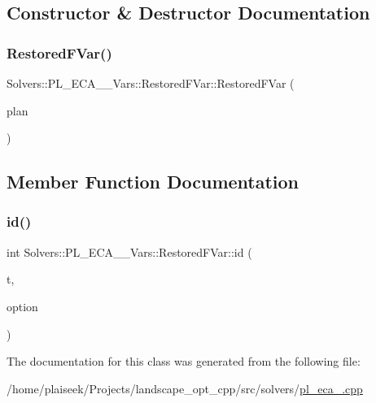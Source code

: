 \subsection{Constructor \& Destructor Documentation}
\mbox{\label{class_solvers_1_1_p_l___e_c_a__2___vars_1_1_restored_f_var_a1b2057a7d94477eb0f782cab5071de7c}} 
\subsubsection{\texorpdfstring{Restored\+F\+Var()}{RestoredFVar()}}
{\footnotesize\ttfamily Solvers\+::\+P\+L\+\_\+\+E\+C\+A\+\_\+\_\+\+Vars\+::\+Restored\+F\+Var\+::\+Restored\+F\+Var (\begin{DoxyParamCaption}\item[{const \hyperlink{class_restoration_plan}{Restoration\+Plan} \&}]{plan }\end{DoxyParamCaption})\hspace{0.3cm}{\ttfamily [inline]}}



\subsection{Member Function Documentation}
\mbox{\label{class_solvers_1_1_p_l___e_c_a__2___vars_1_1_restored_f_var_a90719c3bd2b7d3bdbafd8c3f01a4b598}} 
\subsubsection{\texorpdfstring{id()}{id()}}
{\footnotesize\ttfamily int Solvers\+::\+P\+L\+\_\+\+E\+C\+A\+\_\+\_\+\+Vars\+::\+Restored\+F\+Var\+::id (\begin{DoxyParamCaption}\item[{Graph\+\_\+t\+::\+Node}]{t,  }\item[{const \hyperlink{class_restoration_plan_1_1_option}{Restoration\+Plan\+::\+Option} $\ast$}]{option }\end{DoxyParamCaption})\hspace{0.3cm}{\ttfamily [inline]}}



The documentation for this class was generated from the following file\+:\begin{DoxyCompactItemize}
\item 
/home/plaiseek/\+Projects/landscape\+\_\+opt\+\_\+cpp/src/solvers/\hyperlink{pl__eca__2_8cpp}{pl\+\_\+eca\+\_.\+cpp}\end{DoxyCompactItemize}
